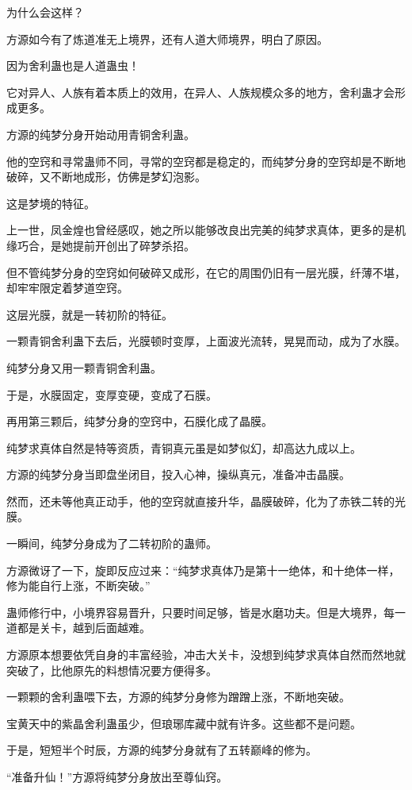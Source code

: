 \begin{this_body}
为什么会这样？

方源如今有了炼道准无上境界，还有人道大师境界，明白了原因。

因为舍利蛊也是人道蛊虫！

它对异人、人族有着本质上的效用，在异人、人族规模众多的地方，舍利蛊才会形成更多。

方源的纯梦分身开始动用青铜舍利蛊。

他的空窍和寻常蛊师不同，寻常的空窍都是稳定的，而纯梦分身的空窍却是不断地破碎，又不断地成形，仿佛是梦幻泡影。

这是梦境的特征。

上一世，凤金煌也曾经感叹，她之所以能够改良出完美的纯梦求真体，更多的是机缘巧合，是她提前开创出了碎梦杀招。

但不管纯梦分身的空窍如何破碎又成形，在它的周围仍旧有一层光膜，纤薄不堪，却牢牢限定着梦道空窍。

这层光膜，就是一转初阶的特征。

一颗青铜舍利蛊下去后，光膜顿时变厚，上面波光流转，晃晃而动，成为了水膜。

纯梦分身又用一颗青铜舍利蛊。

于是，水膜固定，变厚变硬，变成了石膜。

再用第三颗后，纯梦分身的空窍中，石膜化成了晶膜。

纯梦求真体自然是特等资质，青铜真元虽是如梦似幻，却高达九成以上。

方源的纯梦分身当即盘坐闭目，投入心神，操纵真元，准备冲击晶膜。

然而，还未等他真正动手，他的空窍就直接升华，晶膜破碎，化为了赤铁二转的光膜。

一瞬间，纯梦分身成为了二转初阶的蛊师。

方源微讶了一下，旋即反应过来：“纯梦求真体乃是第十一绝体，和十绝体一样，修为能自行上涨，不断突破。”

蛊师修行中，小境界容易晋升，只要时间足够，皆是水磨功夫。但是大境界，每一道都是关卡，越到后面越难。

方源原本想要依凭自身的丰富经验，冲击大关卡，没想到纯梦求真体自然而然地就突破了，比他原先的料想情况要方便得多。

一颗颗的舍利蛊喂下去，方源的纯梦分身修为蹭蹭上涨，不断地突破。

宝黄天中的紫晶舍利蛊虽少，但琅琊库藏中就有许多。这些都不是问题。

于是，短短半个时辰，方源的纯梦分身就有了五转巅峰的修为。

“准备升仙！”方源将纯梦分身放出至尊仙窍。


\end{this_body}
